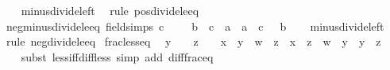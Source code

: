 \begin{isabellebody}
%
\isadelimproof
\ \ %
\endisadelimproof
%
\isatagproof
{}\isamarkupfalse%
\ minus{\isacharunderscore}{\kern0pt}divide{\isacharunderscore}{\kern0pt}left\ \isamarkupfalse%
\ {\isacharparenleft}{\kern0pt}rule\ pos{\isacharunderscore}{\kern0pt}divide{\isacharunderscore}{\kern0pt}le{\isacharunderscore}{\kern0pt}eq{\isacharparenright}{\kern0pt}%
\endisatagproof
{\isafoldproof}%
%
\isadelimproof
\isanewline
%
\endisadelimproof
\isanewline
{}\isamarkupfalse%
\ neg{\isacharunderscore}{\kern0pt}minus{\isacharunderscore}{\kern0pt}divide{\isacharunderscore}{\kern0pt}le{\isacharunderscore}{\kern0pt}eq\ {\isacharbrackleft}{\kern0pt}field{\isacharunderscore}{\kern0pt}simps{\isacharbrackright}{\kern0pt}{\isacharcolon}{\kern0pt}\ {\isachardoublequoteopen}c\ {\isacharless}{\kern0pt}\ {}\ {\isasymLongrightarrow}\ {\isacharminus}{\kern0pt}\ {\isacharparenleft}{\kern0pt}b\ {\isacharslash}{\kern0pt}\ c{\isacharparenright}{\kern0pt}\ {\isasymle}\ a\ {\isasymlongleftrightarrow}\ a\ {\isacharasterisk}{\kern0pt}\ c\ {\isasymle}\ {\isacharminus}{\kern0pt}\ b{\isachardoublequoteclose}\isanewline
%
\isadelimproof
\ \ %
\endisadelimproof
%
\isatagproof
{}\isamarkupfalse%
\ minus{\isacharunderscore}{\kern0pt}divide{\isacharunderscore}{\kern0pt}left\ \isamarkupfalse%
\ {\isacharparenleft}{\kern0pt}rule\ neg{\isacharunderscore}{\kern0pt}divide{\isacharunderscore}{\kern0pt}le{\isacharunderscore}{\kern0pt}eq{\isacharparenright}{\kern0pt}%
\endisatagproof
{\isafoldproof}%
%
\isadelimproof
\isanewline
%
\endisadelimproof
\isanewline
{}\isamarkupfalse%
\ frac{\isacharunderscore}{\kern0pt}less{\isacharunderscore}{\kern0pt}eq{\isacharcolon}{\kern0pt}\isanewline
\ \ {\isachardoublequoteopen}y\ {\isasymnoteq}\ {}\ {\isasymLongrightarrow}\ z\ {\isasymnoteq}\ {}\ {\isasymLongrightarrow}\ x\ {\isacharslash}{\kern0pt}\ y\ {\isacharless}{\kern0pt}\ w\ {\isacharslash}{\kern0pt}\ z\ {\isasymlongleftrightarrow}\ {\isacharparenleft}{\kern0pt}x\ {\isacharasterisk}{\kern0pt}\ z\ {\isacharminus}{\kern0pt}\ w\ {\isacharasterisk}{\kern0pt}\ y{\isacharparenright}{\kern0pt}\ {\isacharslash}{\kern0pt}\ {\isacharparenleft}{\kern0pt}y\ {\isacharasterisk}{\kern0pt}\ z{\isacharparenright}{\kern0pt}\ {\isacharless}{\kern0pt}\ {}{\isachardoublequoteclose}\isanewline
%
\isadelimproof
\ \ %
\endisadelimproof
%
\isatagproof
{}\isamarkupfalse%
\ {\isacharparenleft}{\kern0pt}subst\ less{\isacharunderscore}{\kern0pt}iff{\isacharunderscore}{\kern0pt}diff{\isacharunderscore}{\kern0pt}less{\isacharunderscore}{\kern0pt}{}{\isacharparenright}{\kern0pt}\ {\isacharparenleft}{\kern0pt}simp\ add{\isacharcolon}{\kern0pt}\ diff{\isacharunderscore}{\kern0pt}frac{\isacharunderscore}{\kern0pt}eq\ {\isacharparenright}{\kern0pt}%

\end{isabellebody}
